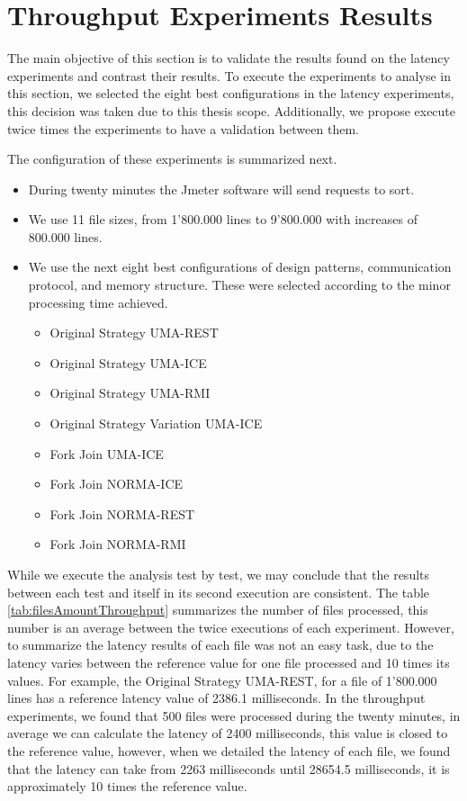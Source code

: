 \section{Throughput Experiments Results}

The main objective of this section is to validate the results found on the latency experiments and contrast their results. To execute the experiments to analyse in this section, we selected the eight best configurations in the latency experiments, this decision was taken due to this thesis scope. Additionally, we propose execute twice times the experiments to have a validation between them.

The configuration of these experiments is summarized next.

\begin{itemize}
	\item During twenty minutes the Jmeter software will send requests to sort. 
	\item We use 11 file sizes, from 1'800.000 lines to 9'800.000 with increases of 800.000 lines.
	\item We use the next eight best configurations of design patterns, communication protocol, and memory structure. These were selected according to the minor processing time achieved.
		\begin{itemize}
			\item Original Strategy UMA-REST
			\item Original Strategy UMA-ICE
			\item Original Strategy UMA-RMI
			\item Original Strategy  Variation UMA-ICE
			\item Fork Join UMA-ICE
			\item Fork Join NORMA-ICE
			\item Fork Join NORMA-REST
			\item Fork Join NORMA-RMI
		\end{itemize}
\end{itemize}

While we execute the analysis test by test, we may conclude that the results between each test and itself in its second execution are consistent. The table \ref{tab:filesAmountThroughput} summarizes the number of files processed, this number is an average between the twice executions of each experiment. However, to summarize the latency results of each file was not an easy task, due to the latency varies between the reference value for one file processed and 10 times its values. For example, the Original Strategy UMA-REST, for a file of 1'800.000 lines has a reference latency value of 2386.1 milliseconds. In the throughput experiments, we found that 500 files were processed during the twenty minutes, in average we can calculate the latency of 2400 milliseconds, this value is closed to the reference value, however, when we detailed the latency of each file, we found that the latency can take from 2263 milliseconds until 28654.5 milliseconds, it is approximately 10 times the reference value. 

